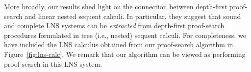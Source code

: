 \documentclass[copyright,creativecommons]{eptcs}
\newcommand{\imp}{\rightarrow}
\newcommand{\set}[1]{\{#1\}}
\begin{document}
More broadly, our results shed light on the connection between depth-first proof-search and linear nested sequent calculi. In particular, they suggest that sound and complete LNS systems can be \emph{extracted} from depth-first proof-search procedures formulated in tree (i.e., nested) sequent calculi. %
For completeness, we have included the LNS calculus obtained from our proof-search algorithm in Figure~\ref{fig:lns-calc}. We remark that our algorithm can be viewed as performing proof-search in this LNS system.

\end{document}
